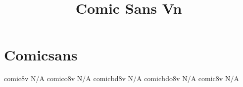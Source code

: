 \documentclass[sample]{vnsample}
\title{Comic Sans Vn}
\begin{document}
\section{Comicsans}
  {comic8v}    {N/A}
 {comico8v}   {N/A}
  {comicbd8v}  {N/A}
 {comicbdo8v} {N/A}
  {comic8v}    {N/A}
\end{document}
